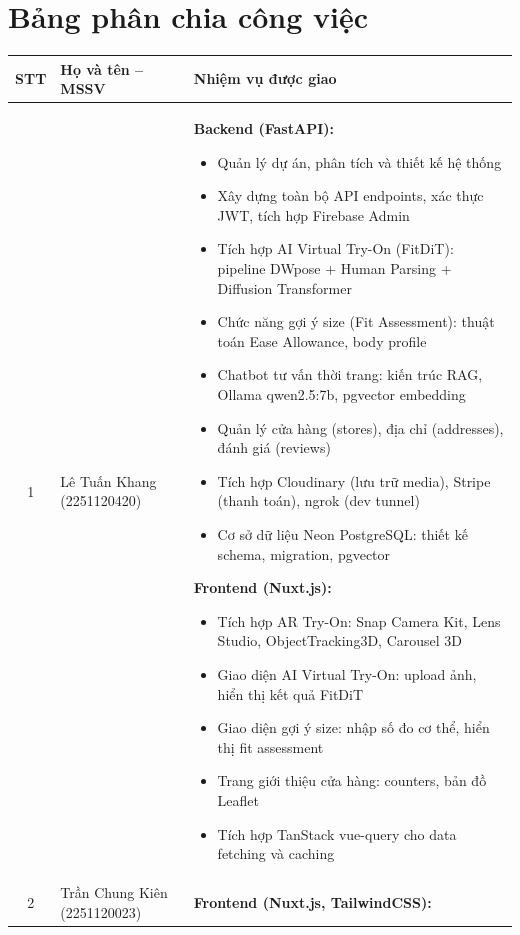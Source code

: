 \chapter*{Bảng phân chia công việc}

\renewcommand{\arraystretch}{1.5}
\begin{longtable}{|c|>{\raggedright\arraybackslash}p{4.5cm}|>{\raggedright\arraybackslash}p{8.5cm}|}
\hline
\textbf{STT} & \textbf{Họ và tên -- MSSV} & \textbf{Nhiệm vụ được giao} \\ \hline
1 & Lê Tuấn Khang (2251120420) &
\textbf{Backend (FastAPI):}
\begin{itemize}[noitemsep, topsep=0pt, leftmargin=*]
    \item Quản lý dự án, phân tích và thiết kế hệ thống
    \item Xây dựng toàn bộ API endpoints, xác thực JWT, tích hợp Firebase Admin
    \item Tích hợp AI Virtual Try-On (FitDiT): pipeline DWpose + Human Parsing + Diffusion Transformer
    \item Chức năng gợi ý size (Fit Assessment): thuật toán Ease Allowance, body profile
    \item Chatbot tư vấn thời trang: kiến trúc RAG, Ollama qwen2.5:7b, pgvector embedding
    \item Quản lý cửa hàng (stores), địa chỉ (addresses), đánh giá (reviews)
    \item Tích hợp Cloudinary (lưu trữ media), Stripe (thanh toán), ngrok (dev tunnel)
    \item Cơ sở dữ liệu Neon PostgreSQL: thiết kế schema, migration, pgvector
\end{itemize}
\textbf{Frontend (Nuxt.js):}
\begin{itemize}[noitemsep, topsep=0pt, leftmargin=*]
    \item Tích hợp AR Try-On: Snap Camera Kit, Lens Studio, ObjectTracking3D, Carousel 3D
    \item Giao diện AI Virtual Try-On: upload ảnh, hiển thị kết quả FitDiT
    \item Giao diện gợi ý size: nhập số đo cơ thể, hiển thị fit assessment
    \item Trang giới thiệu cửa hàng: counters, bản đồ Leaflet
    \item Tích hợp TanStack vue-query cho data fetching và caching
\end{itemize} \\ \hline
2 & Trần Chung Kiên (2251120023) &
\textbf{Frontend (Nuxt.js, TailwindCSS):}

\end{longtable}
